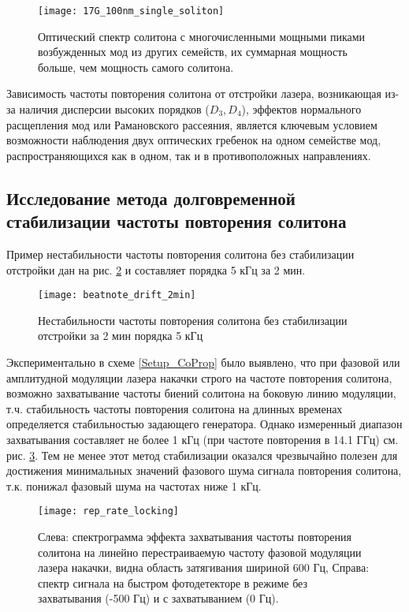 \begin{figure}[ht]
\centering
  \texttt{[image: 17G\_100nm\_single\_soliton]}
  \caption{Оптический спектр солитона с многочисленными мощными пиками возбужденных мод из других семейств, их суммарная мощность больше, чем мощность самого солитона.}
  \label{17G_100nm_single_soliton_amx}
\end{figure}

Зависимость частоты повторения солитона от отстройки лазера, возникающая из-за наличия дисперсии высоких порядков ($D_3,D_4$), эффектов нормального расщепления мод или Рамановского рассеяния, является ключевым условием возможности наблюдения двух оптических гребенок на одном семействе мод, распространяющихся как в одном, так и в противоположных направлениях.

\subsection{Исследование метода долговременной стабилизации частоты повторения солитона}

Пример нестабильности частоты повторения солитона без стабилизации отстройки дан на рис. \ref{beatnote_drift_2min} и составляет порядка 5 кГц за 2 мин.

\begin{figure}[ht]
\centering
  \texttt{[image: beatnote\_drift\_2min]}
  \caption{Нестабильности частоты повторения солитона без стабилизации отстройки за 2 мин порядка 5 кГц}
  \label{beatnote_drift_2min}
\end{figure}

Экспериментально в схеме \ref{Setup_CoProp} было выявлено, что при фазовой или амплитудной модуляции лазера накачки строго на частоте повторения солитона, возможно захватывание частоты биений солитона на боковую линию модуляции, т.ч. стабильность частоты повторения солитона на длинных временах определяется стабильностью задающего генератора. Однако измеренный диапазон захватывания составляет не более 1 кГц (при частоте повторения в 14.1 ГГц) см. рис. \ref{rep_rate_locking}. Тем не менее этот метод стабилизации оказался чрезвычайно полезен для достижения минимальных значений фазового шума сигнала повторения солитона, т.к. понижал фазовый шума на частотах ниже 1 кГц.

\begin{figure}[ht]
\centering
  \texttt{[image: rep\_rate\_locking]}
  \caption{Слева: спектрограмма эффекта захватывания частоты повторения солитона на линейно перестраиваемую частоту фазовой модуляции лазера накачки, видна область затягивания шириной 600 Гц, Справа: спектр сигнала на быстром фотодетекторе в режиме без захватывания (-500 Гц) и с захватыванием (0 Гц).}
  \label{rep_rate_locking}
\end{figure}


